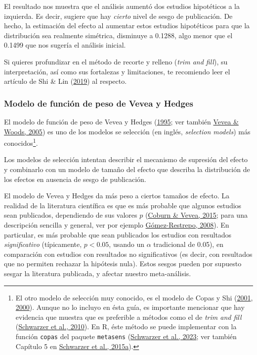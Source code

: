 \documentclass[
  bookmarksnumbered]{article}
\begin{document}
El resultado nos muestra que el análisis aumentó dos estudios hipotéticos a la izquierda. Es decir, sugiere que hay \emph{cierto} nivel de sesgo de publicación. De hecho, la estimación del efecto al aumentar estos estudios hipotéticos para que la distribución sea realmente simétrica, disminuye a 0.1288, algo menor que el 0.1499 que nos sugería el análisis inicial.

Si quieres profundizar en el método de recorte y relleno (\emph{trim and fill}), su interpretación, así como sus fortalezas y limitaciones, te recomiendo leer el artículo de Shi \& Lin (\protect\hyperlink{ref-shiTrimandfill2019}{2019}) al respecto.

\hypertarget{vevea-hedges}{%
\subsubsection{Modelo de función de peso de Vevea y Hedges}\label{vevea-hedges}}

El modelo de función de peso de Vevea y Hedges (\protect\hyperlink{ref-veveaGeneralLinearModel1995}{1995}; ver también \protect\hyperlink{ref-veveaPublicationBiasResearch2005}{Vevea \& Woods, 2005}) es uno de los modelos se selección (en inglés, \emph{selection models}) más conocidos\footnote{El otro modelo de selección muy conocido, es el modelo de Copas y Shi (\protect\hyperlink{ref-copasSensitivityAnalysisPublication2001}{2001}, \protect\hyperlink{ref-copasMetaanalysisFunnelPlots2000}{2000}). Aunque no lo incluyo en ésta guía, es importante mencionar que hay evidencia que muestra que es preferible a métodos como el de \emph{trim and fill} (\protect\hyperlink{ref-schwarzerEmpiricalEvaluationSuggests2010}{Schwarzer et al., 2010}). En R, éste método se puede implementar con la función \texttt{copas} del paquete \texttt{metasens} (\protect\hyperlink{ref-schwarzerMetasensPackage}{Schwarzer et al., 2023}; ver también Capítulo 5 en \protect\hyperlink{ref-schwarzerMetaAnalysis2015}{Schwarzer et al., 2015a}).}.

Los modelos de selección intentan describir el mecanismo de supresión del efecto y combinarlo con un modelo de tamaño del efecto que describa la distribución de los efectos en ausencia de sesgo de publicación.

El modelo de Vevea y Hedges da más peso a ciertos tamaños de efecto. La realidad de la literatura científica es que es más probable que algunos estudios sean publicados, dependiendo de sus valores \(p\) (\protect\hyperlink{ref-coburnPublicationBiasFunction2015}{Coburn \& Vevea, 2015}; para una descripción sencilla y general, ver por ejemplo \protect\hyperlink{ref-SesgoPublicacion2008}{Gómez-Restrepo, 2008}). En particular, es más probable que sean publicados los estudios con resultados \emph{significativo} (típicamente, \(p < 0.05\), usando un \(\alpha\) tradicional de 0.05), en comparación con estudios con resultados no significativos (es decir, con resultados que no permiten rechazar la hipótesis nula). Estos sesgos pueden por supuesto sesgar la literatura publicada, y afectar nuestro meta-análisis.
\end{document}
